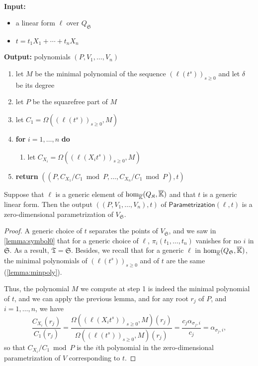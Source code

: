 \documentclass[12pt]{article}
\def\Kbar {{\ensuremath{\overline{\mathbb{K}}}}}
\begin{document}
\begin{algorithm}[H]
	\caption{$\mathsf{ParametrizationGeneric}(\ell,t)$}
	~\\
	{\bf Input:} \vspace{-0.5em}
	\begin{itemize}\setlength\itemsep{0em}
		\item  a linear form $\ell$ over $Q_\mathfrak{S}$
		\item $t=t_1 X_1 + \cdots + t_n X_n$
	\end{itemize}
	{\bf Output:} polynomials $(P,V_1,\dots,V_n)$
	\begin{enumerate}\setlength\itemsep{0em}
		\item let $M$ be the minimal polynomial of the sequence $(\ell(t^s))_{s \ge 0}$ and let $\delta$ be its degree
		\item let $P$ be the squarefree part of $M$
		\item let $C_1 = \Omega((\ell(t^s))_{s\ge0} ,M)$
		\item \textbf{for} $i=1,\dots,n$ \textbf{do}
		\begin{enumerate}
			\item let $C_{X_i} = \Omega((\ell(X_i t^s))_{s\ge0}, M)$ 
		\end{enumerate}
		\item \textbf{return} $((P, C_{X_1}/ C_1 \bmod P, \dots, C_{X_n}/ C_{1} \bmod P),t)$
	\end{enumerate}
	\label{algo:para2}
\end{algorithm}

\begin{lemma}
	Suppose that $\ell$ is a generic element of ${\rm
		hom}_{\Kbar}(Q_\mathfrak{K},\Kbar)$ and that $t$ is a generic
	linear form. Then the output $((P,V_1,\dots,V_n),t)$ of
	$\mathsf{Parametrization}(\ell,t)$ is a zero-dimensional
	parametrization of $V_{\mathfrak{S}}$.
\end{lemma}
\begin{proof}
	A generic choice of $t$ separates the points of $V_{\mathfrak{S}}$,
	and we saw in \cref{lemma:symbol0} that for a generic choice of
	$\ell$, $\pi_i(t_1,\dots,t_n)$ vanishes for no $i$ in
	$\mathfrak{S}$.  As a result, $\mathfrak{T}=\mathfrak{S}$.  Besides,
	we recall that for a generic $\ell$ in ${\rm
		hom}_{\Kbar}(Q_\mathfrak{S},\Kbar)$, the minimal polynomials of
	$(\ell(t^s))_{s \ge 0}$ and of $t$ are the same
	(\cref{lemma:minpoly}).
	
	Thus, the polynomial $M$ we compute at step 1 is indeed the minimal
	polynomial of $t$, and we can apply the previous lemma, and for 
	any root $r_j$ of $P$, and $i=1,\dots,n$, we have
	$$\frac{ C_{X_i}(r_j)}{ C_1(r_j)}  = 
	\frac{\Omega((\ell(X_i t^s))_{s\ge0}, M)(r_j)}{\Omega((\ell(t^s))_{s\ge0} ,M)(r_j)}=
	\frac{c_j \alpha_{\sigma_j,i}}{c_j} = \alpha_{\sigma_j,i},$$
	so that $ C_{X_i}/ C_1 \bmod P$ is the $i$th polynomial in
	the zero-dimensional parametrization of $V$ corresponding to $t$.
\end{proof}
\end{document}
